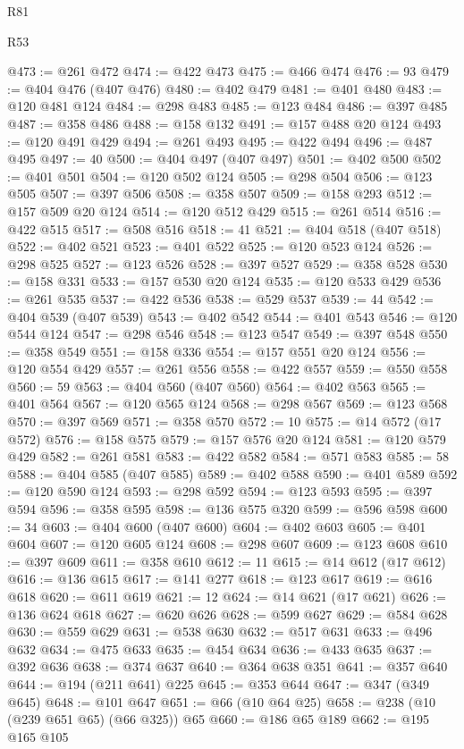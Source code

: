 \begin{lexlean}{R81}
\begin{lexlean}{R53}
\begin{coremodule}
{{{{{{{{{{{{{{{{{{{{{{{{{{{{{{{{{{{{{{{{{{{{{{{{{{{{{{{{{{{{{{{{{{{{{{{{{{{{{{{{{{{{{{{{{{{{{{{{{{{{{{{{{{{{{{{{@473 := @261 @472
@474 := @422 @473
@475 := @466 @474
@476 := 93
@479 := @404 @476 (@407 @476)
@480 := @402 @479
@481 := @401 @480
@483 := @120 @481 @124
@484 := @298 @483
@485 := @123 @484
@486 := @397 @485
@487 := @358 @486
@488 := @158 @132
@491 := @157 @488 @20 @124
@493 := @120 @491 @429
@494 := @261 @493
@495 := @422 @494
@496 := @487 @495
@497 := 40
@500 := @404 @497 (@407 @497)
@501 := @402 @500
@502 := @401 @501
@504 := @120 @502 @124
@505 := @298 @504
@506 := @123 @505
@507 := @397 @506
@508 := @358 @507
@509 := @158 @293
@512 := @157 @509 @20 @124
@514 := @120 @512 @429
@515 := @261 @514
@516 := @422 @515
@517 := @508 @516
@518 := 41
@521 := @404 @518 (@407 @518)
@522 := @402 @521
@523 := @401 @522
@525 := @120 @523 @124
@526 := @298 @525
@527 := @123 @526
@528 := @397 @527
@529 := @358 @528
@530 := @158 @331
@533 := @157 @530 @20 @124
@535 := @120 @533 @429
@536 := @261 @535
@537 := @422 @536
@538 := @529 @537
@539 := 44
@542 := @404 @539 (@407 @539)
@543 := @402 @542
@544 := @401 @543
@546 := @120 @544 @124
@547 := @298 @546
@548 := @123 @547
@549 := @397 @548
@550 := @358 @549
@551 := @158 @336
@554 := @157 @551 @20 @124
@556 := @120 @554 @429
@557 := @261 @556
@558 := @422 @557
@559 := @550 @558
@560 := 59
@563 := @404 @560 (@407 @560)
@564 := @402 @563
@565 := @401 @564
@567 := @120 @565 @124
@568 := @298 @567
@569 := @123 @568
@570 := @397 @569
@571 := @358 @570
@572 := 10
@575 := @14 @572 (@17 @572)
@576 := @158 @575
@579 := @157 @576 @20 @124
@581 := @120 @579 @429
@582 := @261 @581
@583 := @422 @582
@584 := @571 @583
@585 := 58
@588 := @404 @585 (@407 @585)
@589 := @402 @588
@590 := @401 @589
@592 := @120 @590 @124
@593 := @298 @592
@594 := @123 @593
@595 := @397 @594
@596 := @358 @595
@598 := @136 @575 @320
@599 := @596 @598
@600 := 34
@603 := @404 @600 (@407 @600)
@604 := @402 @603
@605 := @401 @604
@607 := @120 @605 @124
@608 := @298 @607
@609 := @123 @608
@610 := @397 @609
@611 := @358 @610
@612 := 11
@615 := @14 @612 (@17 @612)
@616 := @136 @615
@617 := @141 @277
@618 := @123 @617
@619 := @616 @618
@620 := @611 @619
@621 := 12
@624 := @14 @621 (@17 @621)
@626 := @136 @624 @618
@627 := @620 @626
@628 := @599 @627
@629 := @584 @628
@630 := @559 @629
@631 := @538 @630
@632 := @517 @631
@633 := @496 @632
@634 := @475 @633
@635 := @454 @634
@636 := @433 @635
@637 := @392 @636
@638 := @374 @637
@640 := @364 @638 @351
@641 := @357 @640
@644 := @194 (@211 @641) @225
@645 := @353 @644
@647 := @347 (@349 @645)
@648 := @101 @647
@651 := @66 (@10 @64 @25)
@658 := @238 (@10 (@239 @651 @65) (@66 @325)) @65
@660 := @186 @65 @189
@662 := @195 @165 @105
}}}}}}}}}}}}}}}}}}}}}}}}}}}}}}}}}}}}}}}}}}}}}}}}}}}}}}}}}}}}}}}}}}}}}}}}}}}}}}}}}}}}}}}}}}}}}}}}}}}}}}}}}}}}}}}}
\end{coremodule}
\end{lexlean}
\end{lexlean}
